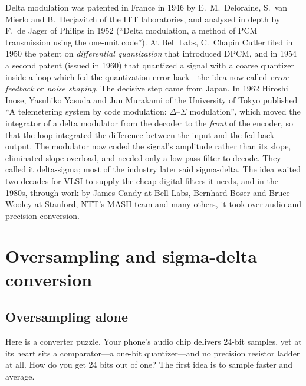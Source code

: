 \begin{history}
Delta modulation was patented in France in 1946 by E.~M.~Deloraine, S.~van Mierlo and
B.~Derjavitch of the ITT laboratories, and analysed in depth by F.~de Jager of Philips in 1952
(``Delta modulation, a method of PCM transmission using the one-unit code''). At Bell Labs,
C.~Chapin Cutler filed in 1950 the patent on \emph{differential quantization} that introduced
DPCM, and in 1954 a second patent (issued in 1960) that quantized a signal with a coarse
quantizer inside a loop which fed the quantization error back---the idea now called
\emph{error feedback} or \emph{noise shaping}. The decisive step came from Japan. In 1962
Hiroshi Inose, Yasuhiko Yasuda and Jun Murakami of the University of Tokyo published ``A
telemetering system by code modulation: $\Delta$--$\Sigma$ modulation'', which moved the
integrator of a delta modulator from the decoder to the \emph{front} of the encoder, so that the
loop integrated the difference between the input and the fed-back output. The modulator now
coded the signal's amplitude rather than its slope, eliminated slope overload, and needed only
a low-pass filter to decode. They called it delta-sigma; most of the industry later said
sigma-delta. The idea waited two decades for VLSI to supply the cheap digital filters it needs,
and in the 1980s, through work by James Candy at Bell Labs, Bernhard Boser and Bruce Wooley at
Stanford, NTT's MASH team and many others, it took over audio and precision conversion.
\end{history}

\section{Oversampling and sigma-delta conversion}
\label{sec:ch05:sigmadelta}

\subsection{Oversampling alone}

Here is a converter puzzle. Your phone's audio chip delivers 24-bit samples, yet at its heart sits
a comparator---a one-bit quantizer---and no precision resistor ladder at all. How do you get 24 bits
out of one? The first idea is to sample faster and average.


